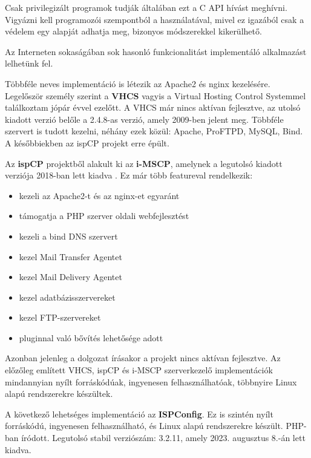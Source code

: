 Csak privilegizált programok tudják általában ezt a C API hívást meghívni. Vigyázni kell programozói szempontból a használatával, mivel ez igazából csak a védelem egy alapját adhatja meg, bizonyos módszerekkel kikerülhető.

Az Interneten sokaságában sok hasonló funkcionalitást implementáló alkalmazást lelhetünk fel.

Többféle neves implementáció is létezik az Apache2 és nginx kezelésére. Legelőször személy szerint a \textbf{VHCS} vagyis a Virtual Hosting Control Systemmel találkoztam jópár évvel ezelőtt. A VHCS már nincs aktívan fejlesztve, az utolsó kiadott verzió belőle a 2.4.8-as verzió, amely 2009-ben jelent meg. \cite{vhcs} Többféle szervert is tudott kezelni, néhány ezek közül: Apache, ProFTPD, MySQL, Bind. A későbbiekben az ispCP projekt erre épült. \cite{ispcp} 

Az \textbf{ispCP} projektből alakult ki az \textbf{i-MSCP}, amelynek a legutolsó kiadott verziója 2018-ban lett kiadva \cite{imscp}. Ez már több featureval rendelkezik:
\begin{itemize}
	\item kezeli az Apache2-t és az nginx-et egyaránt
	\item támogatja a PHP szerver oldali webfejlesztést
	\item kezeli a bind DNS szervert
	\item kezel Mail Transfer Agentet
	\item kezel Mail Delivery Agentet
	\item kezel adatbázisszervereket
	\item kezel FTP-szervereket
	\item pluginnal való bővítés lehetősége adott
\end{itemize}
Azonban jelenleg a dolgozat írásakor a projekt nincs aktívan fejlesztve. Az előzőleg említett VHCS, ispCP és i-MSCP szerverkezelő implementációk mindannyian nyílt forráskódúak, ingyenesen felhasználhatóak, többnyire Linux alapú rendszerekre készültek.

A következő lehetséges implementáció az \textbf{ISPConfig}. Ez is szintén nyílt forráskódú, ingyenesen felhasználható, és Linux alapú rendszerekre készült. PHP-ban íródott. Legutolsó stabil verziószám: 3.2.11, amely 2023. augusztus 8.-án lett kiadva. \cite{ispconfig}

\pagebreak

